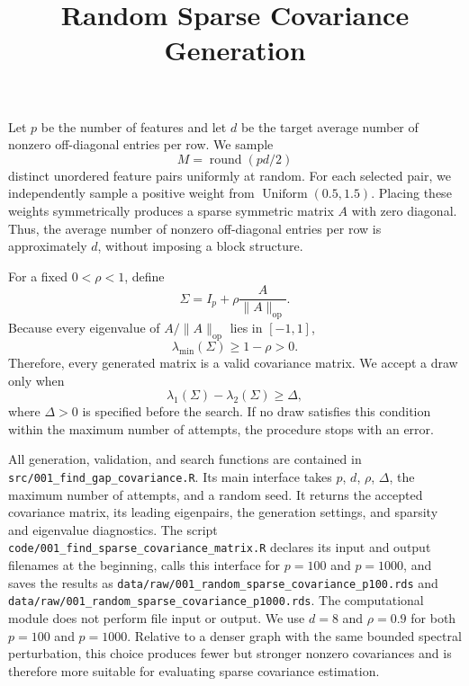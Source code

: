 \documentclass[11pt]{article}
\title{Random Sparse Covariance Generation}
\author{}
\date{}
\begin{document}
\maketitle

Let $p$ be the number of features and let $d$ be the target average number of
nonzero off-diagonal entries per row. We sample
\[
M=\operatorname{round}(pd/2)
\]
distinct unordered feature pairs uniformly at random. For each selected pair,
we independently sample a positive weight from $\operatorname{Uniform}(0.5,1.5)$.
Placing these weights symmetrically produces a sparse symmetric matrix $A$ with
zero diagonal. Thus, the average number of nonzero off-diagonal entries per row
is approximately $d$, without imposing a block structure.

For a fixed $0<\rho<1$, define
\[
\Sigma=I_p+\rho\frac{A}{\lVert A\rVert_{\mathrm{op}}}.
\]
Because every eigenvalue of $A/\lVert A\rVert_{\mathrm{op}}$ lies in
$[-1,1]$,
\[
\lambda_{\min}(\Sigma)\geq 1-\rho>0.
\]
Therefore, every generated matrix is a valid covariance matrix. We accept a
draw only when
\[
\lambda_1(\Sigma)-\lambda_2(\Sigma)\geq \Delta,
\]
where $\Delta>0$ is specified before the search. If no draw satisfies this
condition within the maximum number of attempts, the procedure stops with an
error.

All generation, validation, and search functions are contained in
\texttt{src/001\_find\_gap\_covariance.R}. Its main interface takes $p$, $d$,
$\rho$, $\Delta$, the maximum number of attempts, and a random seed. It returns
the accepted covariance matrix, its leading eigenpairs, the generation
settings, and sparsity and eigenvalue diagnostics. The script
\texttt{code/001\_find\_sparse\_covariance\_matrix.R} declares its input and
output filenames at the beginning, calls this interface for $p=100$ and
$p=1000$, and saves the results as
\texttt{data/raw/001\_random\_sparse\_covariance\_p100.rds} and
\texttt{data/raw/001\_random\_sparse\_covariance\_p1000.rds}. The computational
module does not perform file input or output. We use $d=8$ and $\rho=0.9$ for
both $p=100$ and $p=1000$. Relative to a denser graph with the same bounded
spectral perturbation, this choice produces fewer but stronger nonzero
covariances and is therefore more suitable for evaluating sparse covariance
estimation.
\end{document}

